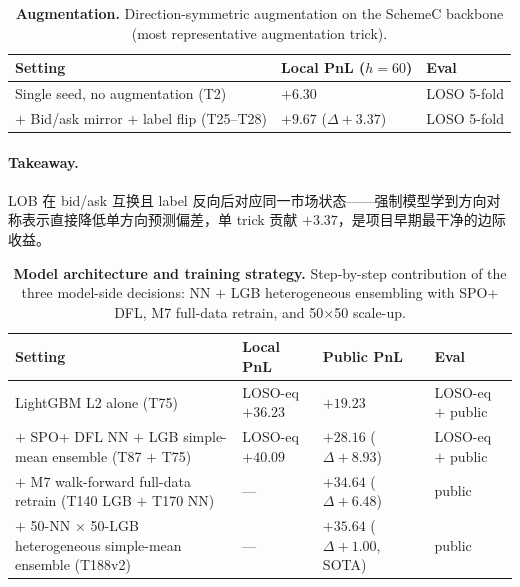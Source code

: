 \documentclass[11pt]{article}
\begin{document}
\begin{table}[!htbp]
\centering
\caption{\textbf{Augmentation.} Direction-symmetric augmentation on the SchemeC backbone (most representative augmentation trick).}
\label{tab:abl_aug}
\setlength{\tabcolsep}{5pt}\renewcommand{\arraystretch}{1.15}
\small
\begin{tabularx}{\textwidth}{@{}>{\raggedright\arraybackslash}X >{\raggedleft\arraybackslash}p{3.6cm} >{\raggedright\arraybackslash}p{3.6cm}@{}}
\toprule
Setting & Local PnL ($h{=}60$) & Eval \\
\midrule
Single seed, no augmentation (T2) & $+6.30$ & LOSO 5-fold \\
$+$ Bid/ask mirror $+$ label flip (T25--T28) & $+9.67$ ($\Delta+3.37$) & LOSO 5-fold \\
\bottomrule
\end{tabularx}
\end{table}

\paragraph{Takeaway.}
LOB 在 bid/ask 互换且 label 反向后对应同一市场状态——强制模型学到方向对称表示直接降低单方向预测偏差，单 trick 贡献 $+3.37$，是项目早期最干净的边际收益。

\begin{table}[!htbp]
\centering
\caption{\textbf{Model architecture and training strategy.} Step-by-step contribution of the three model-side decisions: NN $+$ LGB heterogeneous ensembling with SPO+ DFL, M7 full-data retrain, and 50$\times$50 scale-up.}
\label{tab:abl_model}
\setlength{\tabcolsep}{4pt}\renewcommand{\arraystretch}{1.15}
\small
\begin{tabularx}{\textwidth}{@{}>{\raggedright\arraybackslash}X >{\raggedleft\arraybackslash}p{2.6cm} >{\raggedleft\arraybackslash}p{2.6cm} >{\raggedright\arraybackslash}p{2.2cm}@{}}
\toprule
Setting & Local PnL & Public PnL & Eval \\
\midrule
LightGBM L2 alone (T75)                                                              & LOSO-eq $+36.23$ & $+19.23$                       & LOSO-eq $+$ public \\
$+$ SPO+ DFL NN $+$ LGB simple-mean ensemble (T87 $+$ T75)                           & LOSO-eq $+40.09$ & $+28.16$ ($\Delta+8.93$)       & LOSO-eq $+$ public \\
$+$ M7 walk-forward full-data retrain (T140 LGB $+$ T170 NN)                         & ---              & $+34.64$ ($\Delta+6.48$)       & public \\
$+$ 50-NN $\times$ 50-LGB heterogeneous simple-mean ensemble (T188v2)                & ---              & $+35.64$ ($\Delta+1.00$, SOTA) & public \\
\bottomrule
\end{tabularx}
\end{table}
\end{document}
